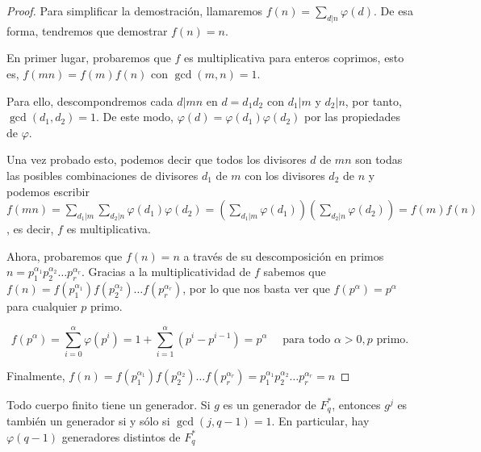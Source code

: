 \begin{proof}
	Para simplificar la demostración, llamaremos $\displaystyle f(n) = \sum_{d|n} \varphi(d)$. De esa forma, tendremos que demostrar $f(n) = n$.
	
	En primer lugar, probaremos que $f$ es multiplicativa para enteros coprimos, esto es, $f(mn) = f(m)f(n)$ con $\gcd(m,n) = 1$.
	
	Para ello, descompondremos cada $d|mn$ en $d = d_1 d_2$ con $d_1|m$ y $d_2|n$, por tanto, $\gcd(d_1, d_2) = 1$.
	De este modo, $\varphi(d) = \varphi(d_1) \varphi(d_2)$ por las propiedades de $\varphi$.
	
	Una vez probado esto, podemos decir que todos los divisores $d$ de $mn$ son todas las posibles combinaciones de divisores $d_1$ de $m$ con los divisores $d_2$ de $n$ y podemos escribir $\displaystyle f(mn) = \sum_{d_1|m} \sum_{d_2|n} \varphi(d_1) \varphi(d_2) = \left(\sum_{d_1|m} \varphi(d_1)\right) \left(\sum_{d_2|n} \varphi(d_2)\right) = f(m) f(n)$, es decir, $f$ es multiplicativa.
	
	Ahora, probaremos que $f(n) = n$ a través de su descomposición en primos $n = p_1^{\alpha_1} p_2^{\alpha_2} \dots p_r^{\alpha_r}$. Gracias a la multiplicatividad de $f$ sabemos que $f(n) = f(p_1^{\alpha_1}) f(p_2^{\alpha_2}) \dots f(p_r^{\alpha_r})$, por lo que nos basta ver que $f(p^\alpha) = p^\alpha$ para cualquier $p$ primo.
	
	$$f(p^\alpha) = \sum_{i = 0}^{\alpha} \varphi(p^i) = 1 + \sum_{i = 1}^{\alpha} (p^i - p^{i-1}) = p^\alpha \quad \text{ para todo } \alpha > 0, p \text{ primo.}$$
	
	Finalmente, $f(n) = f(p_1^{\alpha_1}) f(p_2^{\alpha_2}) \dots f(p_r^{\alpha_r}) = p_1^{\alpha_1} p_2^{\alpha_2} \dots p_r^{\alpha_r} = n$
\end{proof}

\begin{thm}
	Todo cuerpo finito tiene un generador.
	Si $g$ es un generador de $F^*_q$, entonces $g^j$ es también un generador si y sólo si $\gcd(j, q-1) = 1$.
	En particular, hay $\varphi (q-1)$ generadores distintos de $F^*_q$
\end{thm}

